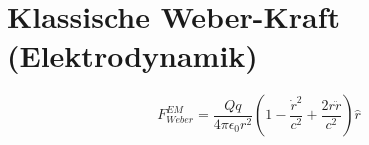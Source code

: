 \section{Klassische Weber-Kraft (Elektrodynamik)}
\[ F_{Weber}^{EM} = \frac{Qq}{4\pi\epsilon_0 r^2}\left(1 - \frac{\dot{r}^2}{c^2} + \frac{2r\ddot{r}}{c^2}\right)\hat{r} \]